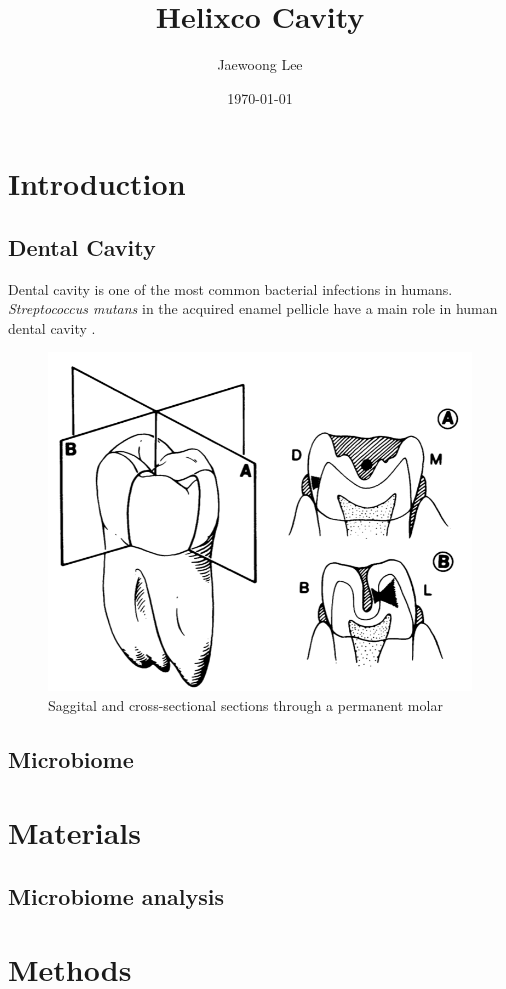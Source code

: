 \documentclass[11pt, a4paper]{article}
\title{Helixco Cavity}
\author{Jaewoong Lee}
\date{\today}
\begin{document}
    \maketitle
    \newpage

    \tableofcontents
    \listoftables
    \listoffigures
    \newpage

    \section{Introduction}
        \subsection{Dental Cavity}
            Dental cavity is one of the most common bacterial infections in humans. \textit{Streptococcus mutans} in the acquired enamel pellicle have a main role in human dental cavity \cite{cavity1, cavity2}.

            \begin{figure}[htbp]
                \centering
                \includegraphics[width=0.4 \linewidth]{figures/molar.png}
                \caption{Saggital and cross-sectional sections through a permanent molar \protect \cite{cavity1}}
                \label{fig:molar}
            \end{figure}

        \subsection{Microbiome}

    \section{Materials}
        \subsection{Microbiome analysis}

    \section{Methods}
\end{document}
